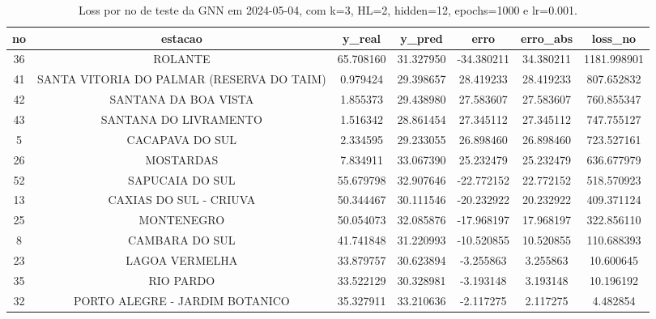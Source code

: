 \begin{table}[h]
\centering
\caption{Loss por no de teste da GNN em 2024-05-04, com k=3, HL=2, hidden=12, epochs=1000 e lr=0.001.}
\label{tab:gnn_loss_k3_hl2_h12_e1000_d20240504}
\begin{tabular}{ccccccc}
\toprule
no & estacao & y\_real & y\_pred & erro & erro\_abs & loss\_no \\
\midrule
36 & ROLANTE & 65.708160 & 31.327950 & -34.380211 & 34.380211 & 1181.998901 \\
41 & SANTA VITORIA DO PALMAR (RESERVA DO TAIM) & 0.979424 & 29.398657 & 28.419233 & 28.419233 & 807.652832 \\
42 & SANTANA DA BOA VISTA & 1.855373 & 29.438980 & 27.583607 & 27.583607 & 760.855347 \\
43 & SANTANA DO LIVRAMENTO & 1.516342 & 28.861454 & 27.345112 & 27.345112 & 747.755127 \\
5 & CACAPAVA DO SUL & 2.334595 & 29.233055 & 26.898460 & 26.898460 & 723.527161 \\
26 & MOSTARDAS & 7.834911 & 33.067390 & 25.232479 & 25.232479 & 636.677979 \\
52 & SAPUCAIA DO SUL & 55.679798 & 32.907646 & -22.772152 & 22.772152 & 518.570923 \\
13 & CAXIAS DO SUL - CRIUVA & 50.344467 & 30.111546 & -20.232922 & 20.232922 & 409.371124 \\
25 & MONTENEGRO & 50.054073 & 32.085876 & -17.968197 & 17.968197 & 322.856110 \\
8 & CAMBARA DO SUL & 41.741848 & 31.220993 & -10.520855 & 10.520855 & 110.688393 \\
23 & LAGOA VERMELHA & 33.879757 & 30.623894 & -3.255863 & 3.255863 & 10.600645 \\
35 & RIO PARDO & 33.522129 & 30.328981 & -3.193148 & 3.193148 & 10.196192 \\
32 & PORTO ALEGRE - JARDIM BOTANICO & 35.327911 & 33.210636 & -2.117275 & 2.117275 & 4.482854 \\
\bottomrule
\end{tabular}
\end{table}

